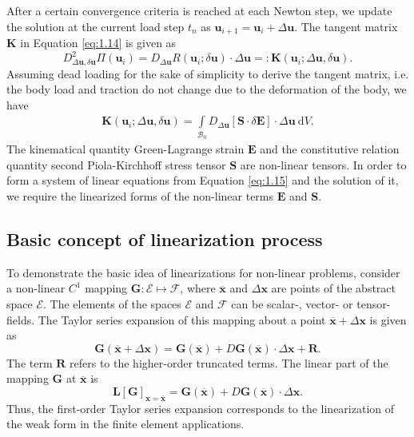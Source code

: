 After a certain convergence criteria is reached at each Newton step, we update the solution at the current load step $t_n$ as $\mathbf{u}_{i+1} = \mathbf{u}_i + \Delta \mathbf{u}$. The tangent matrix $\mathbf{K}$ in Equation \eqref{eq:1.14} is given as 
\begin{equation}
D^2_{\Delta\mathbf{u}, \delta\mathbf{u}} \Pi(\mathbf{u}_{i}) = D_{\Delta\mathbf{u}} R(\mathbf{u}_i; \delta \mathbf{u}) \cdot \Delta\mathbf{u} =: \mathbf{K}(\mathbf{u}_i; \Delta\mathbf{u}, \delta \mathbf{u}).
\end{equation}
Assuming dead loading for the sake of simplicity to derive the tangent matrix, i.e. the body load and traction do not change due to the deformation of the body, we have
\begin{align}
\mathbf{K}(\mathbf{u}_i; \Delta\mathbf{u}, \delta \mathbf{u}) = \int\limits_{\mathcal{B}_0} D_{\Delta\mathbf{u}} \left[ \mathbf{S} \cdot \delta \mathbf{E} \right] \cdot \Delta\mathbf{u} \ \mathrm{d}V.
\label{eq:1.15}
\end{align}
The kinematical quantity Green-Lagrange strain $\mathbf{E}$ and the constitutive relation quantity second Piola-Kirchhoff stress tensor $\mathbf{S}$ are non-linear tensors. In order to form a system of linear equations from Equation \eqref{eq:1.15} and the solution of it, we require the linearized forms of the non-linear terms $\mathbf{E}$ and $\mathbf{S}$.
\subsection{\textbf{Basic concept of linearization process}}
To demonstrate the basic idea of linearizations for non-linear problems, consider a non-linear $C^1$ mapping $\mathbf{G}: \mathcal{E} \mapsto \mathcal{F}$, where $\overline{\mathbf{x}}$ and $\Delta\mathbf{x}$ are points of the abstract space $\mathcal{E}$. The elements of the spaces $\mathcal{E}$ and $\mathcal{F}$ can be scalar-, vector- or tensor-fields. The Taylor series expansion of this mapping about a point $\overline{\mathbf{x}} + \Delta\mathbf{x}$ is given as
\begin{equation}
\mathbf{G}(\overline{\mathbf{x}} + \Delta\mathbf{x}) = \mathbf{G}(\overline{\mathbf{x}}) + D \mathbf{G}(\overline{\mathbf{x}}) \cdot \Delta\mathbf{x} + \mathbf{R}.
\end{equation}
The term $\mathbf{R}$ refers to the higher-order truncated terms. The linear part of the mapping $\mathbf{G}$ at $\overline{\mathbf{x}}$ is 
\begin{equation}
\mathbf{L} \left[ \mathbf{G} \right]_{\mathbf{x} = \overline{\mathbf{x}}} = \mathbf{G}(\overline{\mathbf{x}}) + D \mathbf{G}(\overline{\mathbf{x}}) \cdot \Delta\mathbf{x}.
\end{equation} 
Thus, the first-order Taylor series expansion corresponds to the linearization of the weak form in the finite element applications. 
